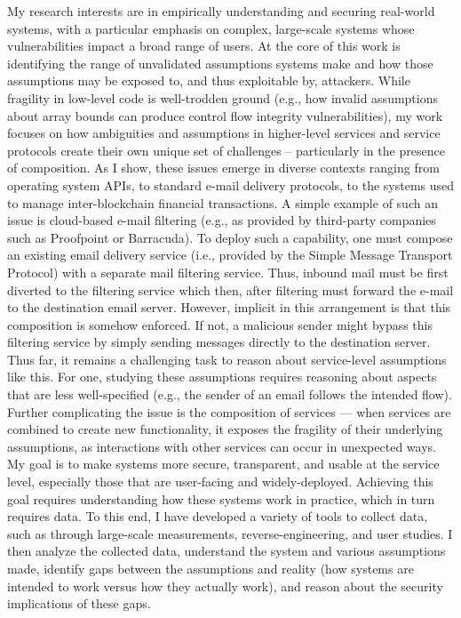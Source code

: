 \documentclass[12pt]{ucsddissertation}
\begin{document}
\begin{dissertationabstract}
My research interests are in empirically understanding and securing real-world systems, with
a particular emphasis on complex, large-scale systems whose vulnerabilities impact a broad range of users.
At the core of this work is identifying the range of unvalidated assumptions systems make and how those
assumptions may be exposed to, and thus exploitable by, attackers. While fragility in low-level code is
well-trodden ground (e.g., how invalid assumptions about array bounds can produce control flow integrity
vulnerabilities), my work focuses on how ambiguities and assumptions in higher-level services and service
protocols create their own unique set of challenges – particularly in the presence of composition. As I
show, these issues emerge in diverse contexts ranging from operating system APIs, to standard e-mail
delivery protocols, to the systems used to manage inter-blockchain financial transactions.
A simple example of such an issue is cloud-based e-mail filtering (e.g., as provided by third-party
companies such as Proofpoint or Barracuda). To deploy such a capability, one must compose an existing
email delivery service (i.e., provided by the Simple Message Transport Protocol) with a separate mail
filtering service. Thus, inbound mail must be first diverted to the filtering service which then, after
filtering must forward the e-mail to the destination email server. However, implicit in this arrangement
is that this composition is somehow enforced. If not, a malicious sender might bypass this filtering service
by simply sending messages directly to the destination server.
Thus far, it remains a challenging task to reason about service-level assumptions like this. For one,
studying these assumptions requires reasoning about aspects that are less well-specified (e.g., the sender
of an email follows the intended flow). Further complicating the issue is the composition of services
— when services are combined to create new functionality, it exposes the fragility of their underlying
assumptions, as interactions with other services can occur in unexpected ways.
My goal is to make systems more secure, transparent, and usable at the service level, especially those
that are user-facing and widely-deployed. Achieving this goal requires understanding how these systems
work in practice, which in turn requires data. To this end, I have developed a variety of tools to collect
data, such as through large-scale measurements, reverse-engineering, and user studies. I then analyze
the collected data, understand the system and various assumptions made, identify gaps between the
assumptions and reality (how systems are intended to work versus how they actually work), and reason
about the security implications of these gaps. 

\end{dissertationabstract}
\end{document}
